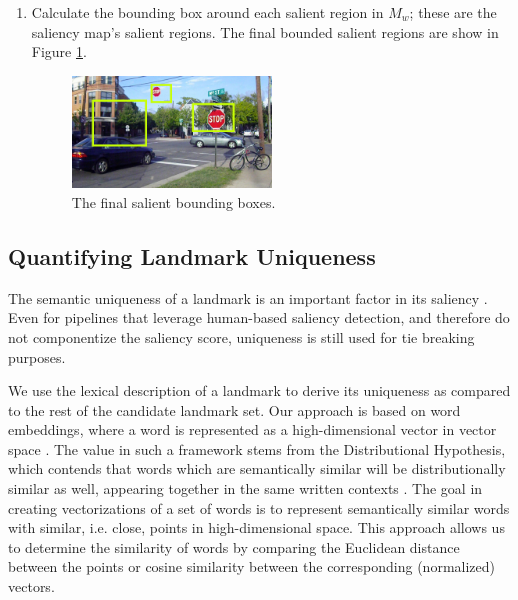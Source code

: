 \begin{enumerate}
\item
Calculate the bounding box around each salient region in $M_w$; these are the saliency map's salient regions. The final bounded salient regions are show in Figure \ref{fig:ws:bb}.

\begin{figure}[htbp]
  \centering
  \includegraphics[width=0.5\textwidth]{ws_images/ws_bb.png}
  \caption{The final salient bounding boxes.}
  \label{fig:ws:bb}
\end{figure}

\end{enumerate}

\subsection{Quantifying Landmark Uniqueness}\label{sec:unique}

The semantic uniqueness of a landmark is an important factor in its saliency \cite{caduff2008assessment}. Even for pipelines that leverage human-based saliency detection, and therefore do not componentize the saliency score, uniqueness is still used for tie breaking purposes.

We use the lexical description of a landmark to derive its uniqueness as compared to the rest of the candidate landmark set. Our approach is based on word embeddings, where a word is represented as a high-dimensional vector in vector space \cite{goldberg2014word2vec}. The value in such a framework stems from the Distributional Hypothesis, which contends that words which are semantically similar will be distributionally similar as well, appearing together in the same written contexts \cite{harris1954distributional}. The goal in creating vectorizations of a set of words is to represent semantically similar words with similar, i.e. close, points in high-dimensional space. This approach allows us to determine the similarity of words by comparing the Euclidean distance between the points or cosine similarity between the corresponding (normalized) vectors.

